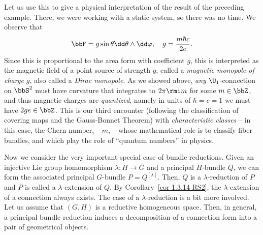 \begin{example}
    Let us use this to give a physical interpretation of the result of the preceding example. There, we were working with a static system, so there was no time. We observe that
    \[\bbF =g\sin\theta \dd\theta\wedge\dd\varphi,\quad g=\frac{m\hbar c}{2e}.\]
    Since this is proportional to the area form with coefficient $g$, this is interpreted as the magnetic field of a point source of strength $g$, called a \emph{magnetic monopole of charge $g$}, also called a \emph{Dirac monopole}. As we showed above, \emph{any} $\U_1$-connection on $\bbS^2$ must have curvature that integrates to $2\pi \rmi m$ for some $m\in \bbZ$, and thus magnetic charges are \emph{quantized}, namely in units of $\hbar=c=1$ we must have $2ge\in\bbZ$. This is our third encounter (following the classification of covering maps and the Gauss-Bonnet Theorem) with \emph{characteristic classes} -- in this case, the Chern number, $-m$, -- whose mathematical role is to classify fiber bundles, and which play the role of ``quantum numbers'' in physics.
\end{example}


Now we consider the very important special case of bundle reductions. Given an injective Lie group homomorphism $\lambda:H\to G$ and a principal $H$-bundle $Q$, we can form the associated principal $G$-bundle $P=Q^{[\lambda]}$. Then, $Q$ is a $\lambda$-reduction of $P$ and $P$ is called a $\lambda$-extension of $Q$. By Corollary~\ref{cor 1.3.14 RS2}, the $\lambda$-extension of a connection always exists. The case of a $\lambda$-reduction is a bit more involved. Let us assume that $(G,H)$ is a reductive homogeneous space. Then, in general, a principal bundle reduction induces a decomposition of a connection form into a pair of geometrical objects.

